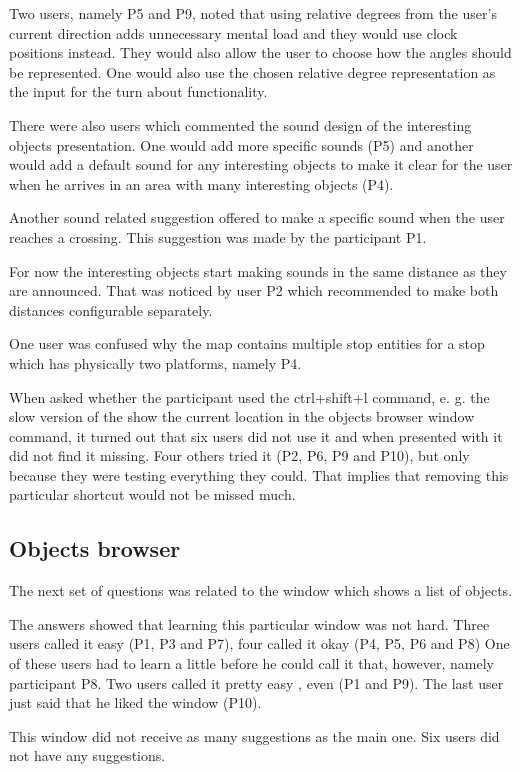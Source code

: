 \documentclass[nolof,digital]{fithesis3}
\begin{document}
Two users, namely  P5 and P9, noted that using relative degrees from the user's current direction adds unnecessary mental load and they would use clock positions instead. They would also allow the user to choose how the angles should be represented. One would also use the chosen relative degree representation as the input for the turn about functionality.

There were also users which commented the sound design of the interesting objects presentation. One would add more specific sounds (P5) and another would add a default sound for any interesting objects to make it clear for the user when he arrives in an area with many interesting objects (P4).

Another sound related suggestion offered to make a specific sound when the user reaches a crossing. This suggestion was made by the participant P1.

For now the interesting objects start making sounds in the same distance as they are announced. That was noticed by user P2 which recommended to make both distances configurable separately.

One  user was confused why the map contains multiple stop entities for a stop which has physically two platforms, namely P4.

When asked whether the participant used the ctrl+shift+l command, e. g. the slow version of the show the current location in the objects browser window command, it turned out that six users did not use it and when presented with it did not find it missing. Four others tried it (P2, P6, P9 and P10), but only because they were testing everything they could. That implies that removing this particular shortcut would not be missed much.
\subsection{Objects browser}
The next set of questions was related to the window which shows a list of objects.

The answers showed that learning this particular window was not hard. Three users called it easy (P1, P3 and P7), four called it okay (P4, P5, P6 and P8) One of these users had to learn a little before he could call it that, however, namely participant P8. Two users called it pretty easy , even (P1 and P9). The last user just said that he liked the window (P10).

This window did not receive as many suggestions as the main one. Six users did not have any suggestions.
\end{document}
